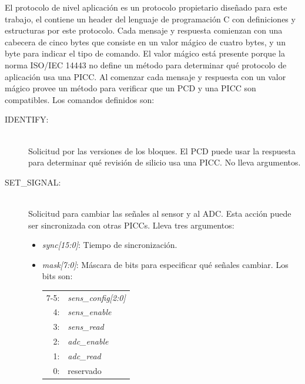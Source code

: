 \documentclass[a4paper, twoside, 11pt]{report}
\begin{document}
El protocolo de nivel aplicación es un protocolo propietario diseñado para este trabajo, el  contiene un header del lenguaje de programación C con definiciones y estructuras por este protocolo. Cada mensaje y respuesta comienzan con una cabecera de cinco bytes que consiste en un valor mágico de cuatro bytes, y un byte para indicar el tipo de comando. El valor mágico está presente porque la norma ISO/IEC 14443 no define un método para determinar qué protocolo de aplicación usa una PICC. Al comenzar cada mensaje y respuesta con un valor mágico provee un método para verificar que un PCD y una PICC son compatibles. Los comandos definidos son:

\begin{description}
  \item[IDENTIFY:] \hfill \\ Solicitud por las versiones de los bloques. El PCD puede usar la respuesta para determinar qué revisión de silicio usa una PICC. No lleva argumentos.
  \item[SET\_SIGNAL:] \hfill \\ Solicitud para cambiar las señales al sensor y al ADC. Esta acción puede ser sincronizada con otras PICCs. Lleva tres argumentos:
  \begin{itemize}
    \item \textit{sync[15:0]}: Tiempo de sincronización.
    \item \textit{mask[7:0]}: Máscara de bits para especificar qué señales cambiar. Los bits son:
    \begin{tabular}{r l}
      7-5: & \textit{sens\_config[2:0]} \\
      4: & \textit{sens\_enable} \\
      3: & \textit{sens\_read} \\
      2: & \textit{adc\_enable} \\
      1: & \textit{adc\_read} \\
      0: & reservado \\
    \end{tabular}

\end{itemize}
\end{description}
\end{document}
